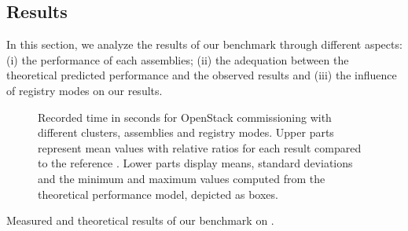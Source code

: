 \subsection{Results}

In this section, we analyze the results of our benchmark through
different aspects: (i) the performance of each assemblies; (ii) the
adequation between the theoretical predicted performance and the
observed results and (iii) the influence of registry modes on our
results.

\begin{figure}[t!]
  \begin{center}
    \def\svgwidth{\columnwidth}
    \def\svgwidth{\columnwidth}
    \caption{Recorded time in seconds for OpenStack commissioning with
      different clusters, assemblies and registry modes. Upper parts
      represent mean values with relative ratios for each result
      compared to the reference \ansass.  Lower parts display means,
      standard deviations and the minimum and maximum values computed
      from the theoretical performance model, depicted as boxes.}
    \label{fig:openstack_results}
  \end{center}
\end{figure}

\begin{table}
    \begin{center}
        
        \caption{Measured and theoretical results of our benchmark on \ecotype.}
        \label{tab:openstack_results}
    \end{center}
\end{table}

